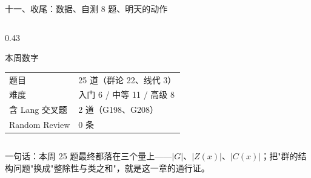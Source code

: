 \documentclass[aspectratio=169,10pt,fontset=none]{ctexbeamer}
\begin{document}
\begin{frame}[t]{十一、收尾：数据、自测 8 题、明天的动作}
\begin{columns}[T,onlytextwidth]
\begin{column}{0.43\textwidth}
\begin{block}{\footnotesize 本周数字}
\begin{tabular}{@{}ll@{}}
          题目 & 25 道（群论 22、线代 3）\\
          难度 & 入门 6 / 中等 11 / 高级 8\\
          含 Lang 交叉题 & 2 道（G198、G208）\\
          Random Review & 0 条\\
        \end{tabular}
      \end{block}
    \end{column}
  \end{columns}
  \vspace{0.2em}
  {\scriptsize\color{ink!70} 一句话：本周 25 题最终都落在三个量上——$|G|$、$|Z(x)|$、$|C(x)|$；把"群的结构问题"换成"整除性与类之和"，就是这一章的通行证。}
\end{frame}
\end{document}
